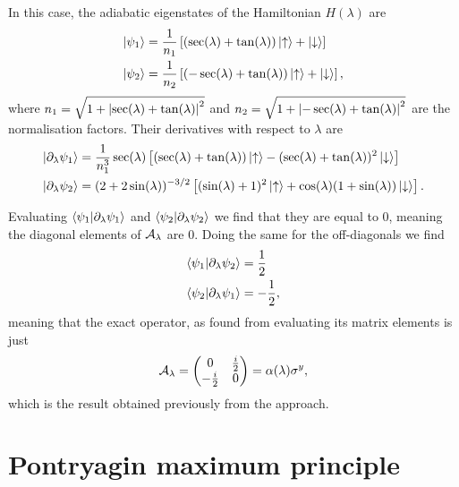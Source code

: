 In this case, the adiabatic eigenstates of the Hamiltonian $H(\lambda)$ are
\begin{equation}
    \begin{aligned}
        \ket{\psi_1} &= \frac{1}{n_1} \left[(\sec(\lambda) + \tan(\lambda)) \ket{\uparrow} + \ket{\downarrow}\right] \\
        \ket{\psi_2} &= \frac{1}{n_2} \left[(-\sec(\lambda) + \tan(\lambda)) \ket{\uparrow} + \ket{\downarrow}\right],
    \end{aligned}
\end{equation}
where $n_1 = \sqrt{1 + \abs{\sec(\lambda) + \tan(\lambda)}^2}$ and $n_2 = \sqrt{1 + \abs{-\sec(\lambda) + \tan(\lambda)}^2}$ are the normalisation factors. Their derivatives with respect to $\lambda$ are
\begin{equation}
    \begin{aligned}
        \ket{\partial_{\lambda} \psi_1} &= \frac{1}{n_1^3} \sec(\lambda) \left[(\sec(\lambda) + \tan(\lambda))\ket{\uparrow}  - (\sec(\lambda) + \tan(\lambda))^2 \ket{\downarrow}\right] \\
        \ket{\partial_{\lambda} \psi_2} &= (2 + 2\sin(\lambda))^{-3/2} \left[(\sin(\lambda) + 1)^2 \ket{\uparrow} + \cos(\lambda)(1 + \sin(\lambda))\ket{\downarrow}\right].
    \end{aligned}
\end{equation}

Evaluating $\braket{\psi_1}{\partial_{\lambda} \psi_1}$ and $\braket{\psi_2}{\partial_{\lambda} \psi_2}$ we find that they are equal to $0$, meaning the diagonal elements of $\mathcal{A}_{\lambda}$ are $0$. Doing the same for the off-diagonals we find 
\begin{equation}
    \begin{aligned}
        \braket{\psi_1}{\partial_{\lambda} \psi_2} &= \frac{1}{2} \\
        \braket{\psi_2}{\partial_{\lambda} \psi_1} &= -\frac{1}{2},
    \end{aligned}
\end{equation}
meaning that the exact  operator, as found from evaluating its matrix elements is just
\begin{equation}
    \AGP{\lambda} = \mqty(0 & \frac{i}{2} \\ -\frac{i}{2} & 0) = \alpha(\lambda) \sy,
\end{equation}
which is the result obtained previously from the  approach. 

\chapter{Pontryagin maximum principle}\label{app:PMP}

